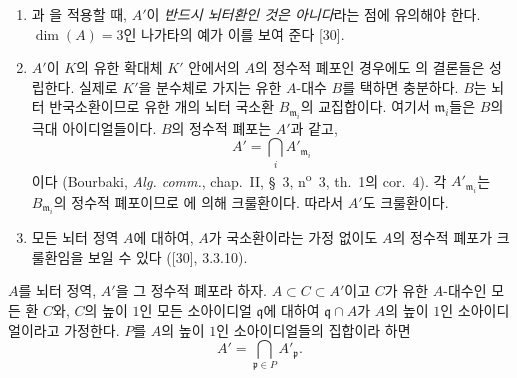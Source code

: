 \begin{remarks}[23.2.8]
\label{0.23.2.8-ko}
\begin{enumerate}
  \item[(i)] 과 을 적용할 때,
  $A'$이 \emph{반드시 뇌터환인 것은 아니다}라는 점에 유의해야 한다.
  $\dim(A)=3$인 나가타의 예가 이를 보여 준다 [30].

  \item[(ii)] $A'$이 $K$의 유한 확대체 $K'$ 안에서의 $A$의 정수적
  폐포인 경우에도 의 결론들은 성립한다. 실제로
  $K'$을 분수체로 가지는 유한 $A$-대수 $B$를 택하면 충분하다.
  $B$는 뇌터 반국소환이므로 유한 개의 뇌터 국소환
  $B_{\mathfrak m_i}$의 교집합이다. 여기서 $\mathfrak m_i$들은
  $B$의 극대 아이디얼들이다. $B$의 정수적 폐포는 $A'$과 같고,
  \[
    A'=\bigcap_i A'_{\mathfrak m_i}
  \]
  이다 (Bourbaki, \emph{Alg. comm.}, chap.~II, §~3,
  n\textsuperscript{o}~3, th.~1의 cor.~4). 각
  $A'_{\mathfrak m_i}$는 $B_{\mathfrak m_i}$의 정수적 폐포이므로
  에 의해 크룰환이다. 따라서 $A'$도 크룰환이다.

  \item[(iii)] 모든 뇌터 정역 $A$에 대하여, $A$가 국소환이라는
  가정 없이도 $A$의 정수적 폐포가 크룰환임을 보일 수 있다
  ([30], 3.3.10).
\end{enumerate}
\end{remarks}

\begin{corollary}[23.2.9]
\label{0.23.2.9-ko}
$A$를 뇌터 정역, $A'$을 그 정수적 폐포라 하자. $A\subset C\subset A'$이고
$C$가 유한 $A$-대수인 모든 환 $C$와, $C$의 높이 $1$인 모든
소아이디얼 $\mathfrak q$에 대하여 $\mathfrak q\cap A$가 $A$의
높이 $1$인 소아이디얼이라고 가정한다. $P$를 $A$의 높이 $1$인
소아이디얼들의 집합이라 하면
\[
  A'=\bigcap_{\mathfrak p\in P}A'_{\mathfrak p}.
\]
\end{corollary}

